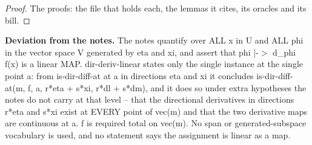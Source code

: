 %
\begin{proof}
%
The proofs: the file that holds each, the lemmas it cites, its oracles and its bill.
%
%
%
%
\end{proof}
%
\noindent\textbf{Deviation from the notes.} The notes quantify over ALL x in U and ALL phi in the vector space V generated by eta and xi, and assert that phi |-$>$ d\_phi f(x) is a linear MAP. dir-deriv-linear states only the single instance at the single point a: from is-dir-diff-at at a in directions eta and xi it concludes is-dir-diff-at(m, f, a, r*eta + s*xi, r*dl + s*dm), and it does so under extra hypotheses the notes do not carry at that level -- that the directional derivatives in directions r*eta and s*xi exist at EVERY point of vec(m) and that the two derivative maps are continuous at a. f is required total on vec(m). No span or generated-subspace vocabulary is used, and no statement says the assignment is linear as a map.
%
\renewcommand{\thethm}{2.28}

